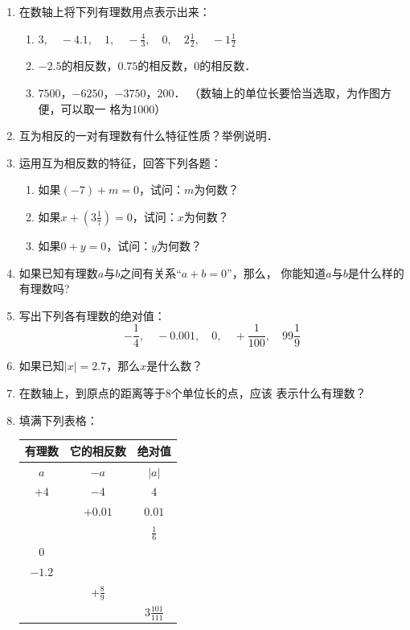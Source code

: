 \begin{enumerate}
\item 在数轴上将下列有理数用点表示出来：
\begin{enumerate}
    \item $3,\quad -4.1,\quad 1,\quad -\frac{4}{3},\quad 0,\quad 2\frac{1}{2},\quad -1\frac{1}{2}$
    \item $-2.5$的相反数，$0.75$的相反数，0的相反数．
    \item $7500$，$-6250$，$-3750$，$200$．
    （数轴上的单位长要恰当选取，为作图方便，可以取一
格为1000）
\end{enumerate}


\item 互为相反的一对有理数有什么特征性质？举例说明．
\item 运用互为相反数的特征，回答下列各题：
\begin{enumerate}
    \item 如果$(-7) +m=0$，试问：$m$为何数？
    \item 如果$x+\left(3\frac{1}{7}\right)=0$，试问：$x$为何数？
    \item 如果$0+y=0$，试问：$y$为何数？
\end{enumerate}


\item 如果已知有理数$a$与$b$之间有关系“$a+b=0$”，那么，
你能知道$a$与$b$是什么样的有理数吗?
\item 写出下列各有理数的绝对值：
\[-\frac{1}{4},\quad -0.001,\quad 0,\quad +\frac{1}{100},\quad 99\frac{1}{9}\]

\item 如果已知$|x|= 2.7$，那么$x$是什么数？
\item 在数轴上，到原点的距离等于8个单位长的点，应该
表示什么有理数？
\item 填满下列表格：
\begin{center}
    \renewcommand{\arraystretch}{1.8}
    \begin{tabular}{ccc}
\hline
有理数&它的相反数&绝对值\\
\hline
$a$  &   $-a$   &   $|a|$\\ 
$+4$  &   $-4$   &   $4$\\ 
  &   $+0.01$   &   $0.01$\\ 
  &      &   $\frac{1}{6}$\\ 
$0$  &      &   \\ 
$-1.2$  &      &   \\ 
  &   $+\frac{8}{9}$   &   \\ 
  &      &   $3\frac{101}{111}$\\ 
\hline
    \end{tabular}
\end{center}


\end{enumerate}
